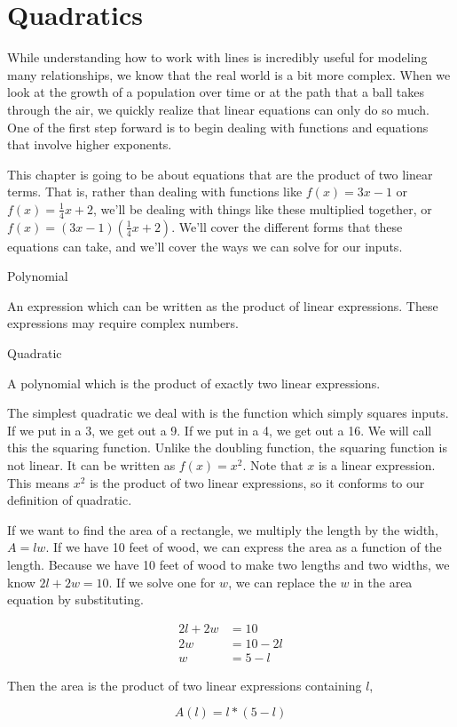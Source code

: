 \chapter{Quadratics}

While understanding how to work with lines is incredibly useful for modeling many relationships, we know that the real world is a bit more complex.  When we look at the growth of a population over time or at the path that a ball takes through the air, we quickly realize that linear equations can only do so much.  One of the first step forward is to begin dealing with functions and equations that involve higher exponents.  

This chapter is going to be about equations that are the product of two linear terms.  That is, rather than dealing with functions like $f(x) = 3x - 1$ or $f(x) = \frac{1}{4}x + 2$, we'll be dealing with things like these multiplied together, or $f(x) = (3x-1)(\frac{1}{4}x + 2)$.  We'll cover the different forms that these equations can take, and we'll cover the ways we can solve for our inputs.

\begin{presentation}
\begin{defn}
Polynomial

An expression which can be written as the product of linear expressions.  These expressions may require complex numbers.
\end{defn}
\end{presentation}

\begin{defn}
Quadratic

A polynomial which is the product of exactly two linear expressions.
\end{defn}

The simplest quadratic we deal with is the function which simply squares inputs.  If we put in a 3, we get out a 9.  If we put in a 4, we get out a 16.  We will call this the squaring function.  Unlike the doubling function, the squaring function is not linear.  It can be written as $f(x) = x^2$.  Note that $x$ is a linear expression.  This means $x^2$ is the product of two linear expressions, so it conforms to our definition of quadratic.

\begin{example}
If we want to find the area of a rectangle, we multiply the length by the width, $A = lw$.  If we have 10 feet of wood, we can express the area as a function of the length.  Because we have 10 feet of wood to make two lengths and two widths, we know $2l + 2w = 10$.   If we solve one for $w$, we can replace the $w$ in the area equation by substituting.

$$\begin{array}{rl}
2l + 2w & = 10\\
2w & = 10 - 2l\\
w & = 5 - l\end{array}$$

Then the area is the product of two linear expressions containing $l$, 

$$A(l) = l*(5 - l)$$
\end{example}

